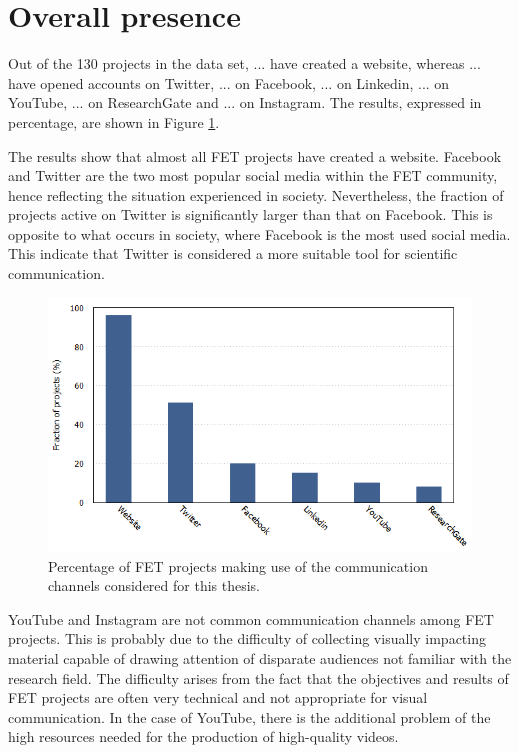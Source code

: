 \section{Overall presence} \label{Overall_presence}
Out of the 130 projects in the data set, ... have created a website, whereas ... have opened accounts on Twitter, ... on Facebook, ... on  Linkedin, ... on YouTube, ... on ResearchGate and ... on Instagram. The results, expressed in percentage, are shown in Figure \ref{Social_media}.

The results show that almost all FET projects have created a website. Facebook and Twitter are the two most popular social media within the FET community, hence reflecting the situation experienced in society. Nevertheless, the fraction of projects active on Twitter is significantly larger than that on Facebook. This is opposite to what occurs in society, where Facebook is the most used social media. This indicate that Twitter is considered a more suitable tool for scientific communication. 

\begin{figure}[!t] 
 \begin{center}
 \includegraphics[scale=0.4]{Images/Social_media.png}
 \caption{Percentage of FET projects making use of the communication channels considered for this thesis.}
 \label{Social_media}
 \end{center}
\end{figure}

YouTube and Instagram are not common communication channels among FET projects. This is probably due to the difficulty of collecting visually impacting material capable of drawing attention of disparate audiences not familiar with the research field. The difficulty arises from the fact that the objectives and results of FET projects are often very technical and not appropriate for visual communication. In the case of YouTube, there is the additional problem of the high resources needed for the production of high-quality videos.

